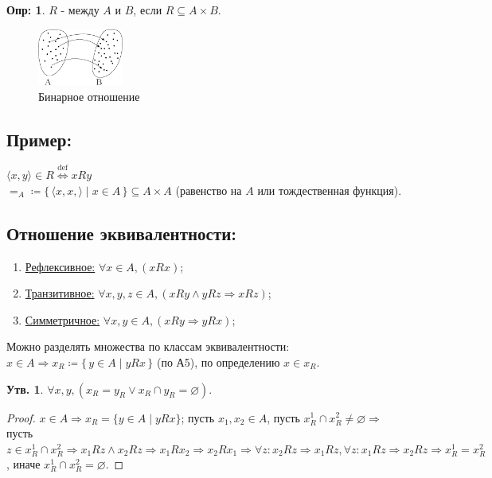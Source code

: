 \documentclass[12pt]{article}
\theoremstyle{definition}
\newtheorem{defn}{Опр:}
\newtheorem{prop}{Утв.}
\begin{document}
\begin{defn}
	$R$ -  между $A$ и $B$, если $R \subseteq A \times B$.
\end{defn}	

\begin{figure}[H]
	\centering
	\includegraphics[width=0.25\textwidth]{ML2_1.eps}
	\caption{Бинарное отношение}
	\label{fig:2_1}
\end{figure}
	
\subsection*{Пример:}
$\langle x, y \rangle \in R \overset{\text{def}}{\Leftrightarrow} xRy$\\
$=_A \coloneqq \{\,\langle x,x,\rangle \mid x \in A\,\} \subseteq A \times A$ (равенство на $A$ или тождественная функция).
\newpage
\subsection*{Отношение эквивалентности:}

\begin{enumerate}[label={(\arabic*)}]
	\item \underline{Рефлексивное:} $\forall x \in A, (xRx)$;
	\item \underline{Транзитивное:} $\forall x, y, z \in A, (xRy \wedge yRz \Rightarrow xRz)$;
	\item \underline{Симметричное:} $\forall x, y \in A, (xRy \Rightarrow yRx)$;
\end{enumerate}

Можно разделять множества по классам эквивалентности: $x \in A \Rightarrow x_R \coloneqq \{\,y \in A \mid yRx\,\}$ (по А5), по определению $x \in x_R$.	

\begin{prop}
	$\forall x, y, (x_R = y_R \vee x_R \cap y_R = \varnothing)$.
\end{prop}

\begin{proof}
	$x \in A \Rightarrow x_R = \{y \in A \mid yRx\}$; пусть $x_1, x_2 \in A$, пусть $x_R^1 \cap x_R^2 \neq \varnothing \Rightarrow $ пусть $z \in x_R^1 \cap x_R^2 \Rightarrow x_1Rz \wedge x_2Rz \Rightarrow x_1Rx_2 \Rightarrow x_2Rx_1 \Rightarrow \forall z \colon x_2Rz \Rightarrow x_1Rz, \forall z \colon x_1Rz \Rightarrow x_2Rz \Rightarrow x_R^1 = x_R^2$, иначе $x_R^1 \cap x_R^2 = \varnothing$.
\end{proof}
\end{document}
